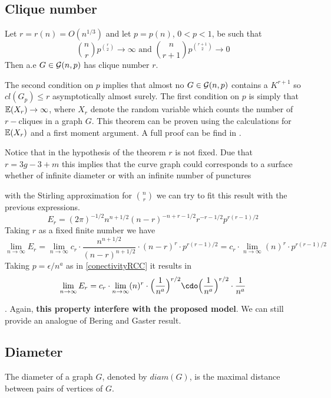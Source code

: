 \subsection{Clique number}

\begin{theorem}
Let $r = r(n) = O(n^{1/3})$ and let $p=p(n)$, $0<p<1$, be such that
$$\binom{n}{r} p^{\binom{r}{2}} \to \infty \text{ and } \binom{n}{r+1} p^{\binom{r+1}{2}} \to 0 $$
Then a.e $G\in\mathcal{G}(n,p)$ has clique number $r$.
\end{theorem}

The second condition on $p$ implies that almost no $G\in\mathcal{G}(n,p)$ contains a $K^{r+1}$ so $cl(G_{p})\leq r$ asymptotically almost surely. The first condition on $p$ is simply that $\mathbb{E} (X_{r}) \to  \infty$, where $X_r$ denote the random variable which counts the number of $r-$cliques in a graph $G$. This theorem can be proven using the calculations for $\mathbb{E}(X_{r})$ and a first moment argument. A full proof can be find in \cite[Bollobás, p.290]{Bollobas}.

Notice that in the hypothesis of the theorem $r$ is not fixed. Due that $r=3g-3+m$ this implies that the curve graph could corresponds to a surface whether of infinite diameter or with an infinite number of punctures

with the Stirling approximation for $\binom{n}{r}$ we can try to fit this result with the previous expressions.
$$E_{r} = (2\pi)^{- 1/2} n^{n+ 1/2} (n - r)^{-n+r-1/2} r^{-r-1/2} p^{r(r- 1)/2}$$
Taking $r$ as a fixed finite number we have
$$\displaystyle\lim_{n\to \infty } E_{r} = \displaystyle\lim_{n\to \infty} c_{r}\cdot \frac{n^{n+1/2}}{(n-r)^{n+1/2}} \cdot (n-r)^{r}\cdot p^{r(r-1)/2} = c_{r}\cdot \displaystyle\lim_{n\to \infty}  (n)^{r}\cdot p^{r(r-1)/2}$$
Taking $p=\epsilon/n^{a}$ as in \ref{conectivityRCC} it results in
$$\displaystyle\lim_{n\to \infty } E_{r} =  c_{r}\cdot \displaystyle\lim_{n\to \infty}  (n)^{r}\cdot\Big(\frac{1}{n^a}\Big)^{r/2}\cdo \Big(\frac{1}{n^a}\Big)^{r/2}
\cdot\frac{1}{n^a}$$



. Again, \textbf{this property interfere with the proposed model}. We can still provide an analogue of Bering and Gaster result.

\subsection{Diameter}

The diameter of a graph $G$, denoted by $diam(G)$, is the maximal distance between pairs of vertices of $G$.

